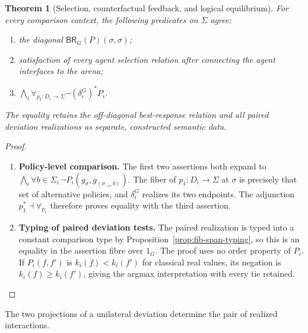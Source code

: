 \documentclass[11pt,a4paper]{article}
\numberwithin{equation}{section}
\newtheorem{theorem}{Theorem}[section]
\theoremstyle{definition}
\theoremstyle{remark}
\theoremstyle{plain}
\begin{document}
\begin{theorem}[Selection, counterfactual feedback, and logical equilibrium]
\label{thm:cgt-selection-equilibrium}
For every comparison context, the following predicates on $\Sigma$ agree:
\begin{enumerate}[label=\textup{(\roman*)},leftmargin=*]
\item the diagonal $\mathsf{BR}_G(P)(\sigma,\sigma)$;
\item satisfaction of every agent selection relation after connecting
the agent interfaces to the arena;
\item $\displaystyle\bigwedge_i
 \forall_{p_1:D_i\to\Sigma}\neg(\delta_i^G)^*P_i$.
\end{enumerate}
The equality retains the off-diagonal best-response relation and all paired
deviation realizations as separate, constructed semantic data.
\end{theorem}
\begin{proof}
\leavevmode
\begin{enumerate}[label=\textup{(\arabic*)},leftmargin=*,itemsep=4pt,topsep=3pt]
  \item \textbf{Policy-level comparison.} The first two assertions both expand to
$\bigwedge_i\forall b\in\Sigma_i\,
 \neg P_i(g_\sigma,g_{(\sigma_{-i},b)})$. The fiber of $p_1:D_i\to\Sigma$ at $\sigma$ is precisely that set of
alternative policies, and $\delta_i^G$ realizes its two endpoints. The adjunction $p_1^*\dashv\forall_{p_1}$ therefore proves equality
with the third assertion.
  \item \textbf{Typing of paired deviation tests.} The paired realization is typed into a constant
comparison type by Proposition~\ref{prop:fib-span-typing}, so this is
an equality in the assertion fibre over $1_G$. The proof uses no order
property of $P_i$. If $P_i(f,f')$ is $k_i(f)<k_i(f')$ for classical
real values, its negation is $k_i(f)\geq k_i(f')$, giving the argmax interpretation with every tie retained.
\end{enumerate}
\end{proof}

\noindent The two projections of a unilateral deviation determine the pair of realized interactions.
\begin{center}
\end{center}
\end{document}
